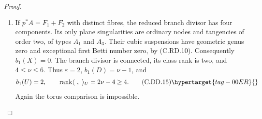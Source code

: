 \begin{proof}
\begin{enumerate}[label={$\langle1\rangle$\arabic*.},leftmargin=*]
\paragraph{One simple common zero.}
For $v=1$, one has $B=R_1+R_2+F_0$, still reduced.
It is connected because the fibre meets both
horizontal components. Here $c=3$, $b_0=1$,
$\nu\ge2$, and
$\delta(B)=6-g\le5$.
Statement  supplies
$\sum p_g\le1$ and $\lambda\le2$.
The section and the fibre have independent classes,
so $r=2$ and $\varepsilon=1$.
Equations \eqref{cdp:eq:C.DD.8}--\eqref{cdp:eq:C.DD.10} yield
\[
 b_1(U)\le3,\qquad
 \operatorname{rank}\langle\ ,\ \rangle_U
                         \ge4g+2\nu-6\ge2.
\tag{C.DD.13}\hypertarget{tag-00EP}{}\label{cdp:eq:C.DD.13}
\]
This is the same contradiction.

\paragraph{The exact form when the common divisor has degree two.}
Now $N=\OO\oplus\OO(-2)$ by \eqref{cdp:eq:C.DD.4}.
Let $x$ and $y$ be its projections, valued in
$\OO$ and $\OO(-2)$ respectively. The coefficient
of $x^2$ in the irreducible quadratic is a nonzero
constant. Completing its square is a global bundle
automorphism: the mixed coefficient is a section
of $\OO(2)$ and therefore defines an actual map
$\OO(-2)\to\OO$. After a nonzero constant rescaling,
the tensor has the form
\[
 P=a\,y\,(x^2-b y^2),\qquad
 a\in H^0(H,\OO(2)),\quad b\in H^0(H,\OO(4)).
\tag{C.DD.14}\hypertarget{tag-00EQ}{}\label{cdp:eq:C.DD.14}
\]
Its horizontal root divisors are
$R_1=\{y=0\}$ and $R_2=\{x^2-b y^2=0\}$.
They are disjoint. The quadratic cover has branch
degree at most four. Riemann--Hurwitz and $g\ge1$
force $g=1$, branch degree four, and four distinct
simple zeros of $b$. Thus $R_2$ is already a smooth
elliptic curve. A ruling fibre meets it either at
two transverse points or at a single point of
contact two. This verifies the local models used
in both remaining cases.

\item If $p^*A=F_1+F_2$ with distinct fibres, the reduced
branch divisor has four components. Its only plane
singularities are ordinary nodes and tangencies of
order two, of types $A_1$ and $A_3$.
Their cubic suspensions have geometric genus zero
and exceptional first Betti number zero, by
(C.RD.10). Consequently $b_1(X)=0$.
The branch divisor is connected, its class rank
is two, and $4\le\nu\le6$.
Thus $\varepsilon=2$, $b_1(D)=\nu-1$, and
\[
 b_1(U)=2,\qquad
 \operatorname{rank}\langle\ ,\ \rangle_U
                       =2\nu-4\ge4.
\tag{C.DD.15}\hypertarget{tag-00ER}{}\label{cdp:eq:C.DD.15}
\]
Again the torus comparison is impossible.


\end{enumerate}
\end{proof}

